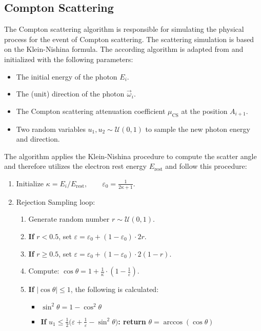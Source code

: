 \subsection{Compton Scattering}

The Compton scattering algorithm is responsible for simulating the physical process for the event of Compton scattering. The scattering simulation
is based on the Klein-Nishina formula. The according algorithm is adapted from \cite{ozmutlu1992sampling} and initialized with the following parameters:

\begin{itemize}
    \item The initial energy of the photon $E_i$.
    \item The (unit) direction of the photon $\vec{\omega}_i$.
    \item The Compton scattering attenuation coefficient $\mu_{\text{CS}}$ at the position
    $A_{i+1}$.
    \item Two random variables $u_1, u_2 \sim \mathcal{U}(0, 1)$ to sample the
    new photon energy and direction.
\end{itemize}

The algorithm applies the Klein-Nishina procedure to compute the scatter angle
and therefore utilizes the electron rest energy $E_\text{rest}$ and follow this
procedure:

\begin{enumerate}[label=\arabic*.]
    \item Initialize $\kappa = E_i/ E_\text{rest}, \qquad \varepsilon_0 = \frac{1}{2\kappa + 1}$.
    \item Rejection Sampling loop:
        \begin{enumerate}[label*=\arabic*.]
            \item Generate random number $r\sim\mathcal{U}(0,1)$.
            \item \textbf{If} $r < 0.5$, set $\varepsilon = \varepsilon_0 +
            (1-\varepsilon_0) \cdot 2r$.
            \item \textbf{If} $r \geq 0.5$, set $\varepsilon = \varepsilon_0 +
            (1-\varepsilon_0) \cdot 2(1-r)$.
            \item Compute: $\cos \theta = 1 + \frac{1}{\kappa} \cdot (1-\frac{1}{\varepsilon})$.
            \item \textbf{If} $\vert \cos \theta \vert \leq 1$, the following is calculated:
            \begin{itemize}[label={}]
                \item $\sin^2 \theta = 1 - \cos^2 \theta$
                \item \textbf{If} $u_1 \leq \frac{1}{2}\bigg(\varepsilon + \frac{1}{\varepsilon}- \sin^2 \theta\bigg)$\textbf{: \qquad return } $\theta = \arccos(\cos \theta)$
            \end{itemize}
        \end{enumerate}
\end{enumerate}

